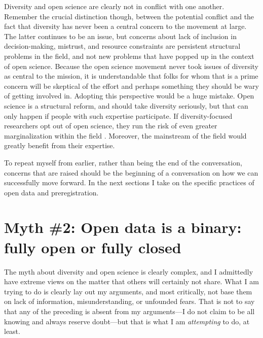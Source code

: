 \documentclass[authordate, empirical]{jote-new-article}
\begin{document}
Diversity and open science are clearly not in conflict with one another. Remember the crucial distinction though, between the potential conflict and the fact that diversity has never been a central concern to the movement at large. The latter continues to be an issue, but concerns about lack of inclusion in decision-making, mistrust, and resource constraints are persistent structural problems in the field, and not new problems that have popped up in the context of open science. Because the open science movement never took issues of diversity as central to the mission, it is understandable that folks for whom that is a prime concern will be skeptical of the effort and perhaps something they should be wary of getting involved in. Adopting this perspective would be a huge mistake. Open science is a structural reform, and should take diversity seriously, but that can only happen if people with such expertise participate. If diversity-focused researchers opt out of open science, they run the risk of even greater marginalization within the field \parencites[see][for a similar argument]{Causadias2021}. Moreover, the mainstream of the field would greatly benefit from their expertise.







To repeat myself from earlier, rather than being the end of the conversation, concerns that are raised should be the beginning of a conversation on how we can successfully move forward. In the next sections I take on the specific practices of open data and preregistration.







\section{Myth \#2: Open data is a binary: fully open or fully closed}







The myth about diversity and open science is clearly complex, and I admittedly have extreme views on the matter that others will certainly not share. What I am trying to do is clearly lay out my arguments, and most critically, not base them on lack of information, misunderstanding, or unfounded fears. That is not to say that any of the preceding is absent from my arguments—I do not claim to be all knowing and always reserve doubt—but that is what I am \emph{attempting} to do, at least.
\end{document}
